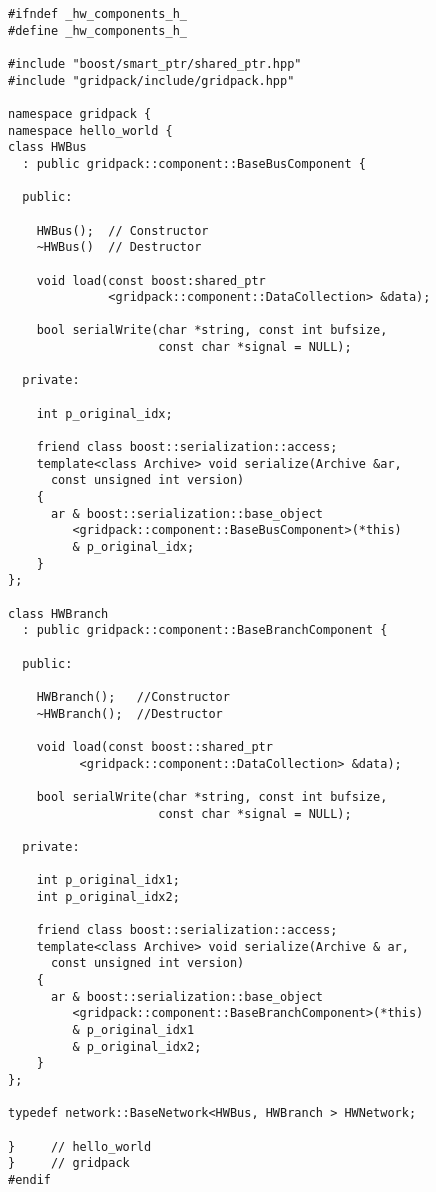 {
\color{red}
\begin{Verbatim}[fontseries=b]
#ifndef _hw_components_h_
#define _hw_components_h_

#include "boost/smart_ptr/shared_ptr.hpp"
#include "gridpack/include/gridpack.hpp"

namespace gridpack {
namespace hello_world {
class HWBus
  : public gridpack::component::BaseBusComponent {

  public:

    HWBus();  // Constructor
    ~HWBus()  // Destructor

    void load(const boost:shared_ptr
              <gridpack::component::DataCollection> &data);

    bool serialWrite(char *string, const int bufsize,
                     const char *signal = NULL);

  private:

    int p_original_idx;

    friend class boost::serialization::access;
    template<class Archive> void serialize(Archive &ar,
      const unsigned int version)
    {
      ar & boost::serialization::base_object
         <gridpack::component::BaseBusComponent>(*this)
         & p_original_idx;
    }
};

class HWBranch
  : public gridpack::component::BaseBranchComponent {

  public:

    HWBranch();   //Constructor
    ~HWBranch();  //Destructor

    void load(const boost::shared_ptr
          <gridpack::component::DataCollection> &data);

    bool serialWrite(char *string, const int bufsize,
                     const char *signal = NULL);

  private:

    int p_original_idx1;
    int p_original_idx2;

    friend class boost::serialization::access;
    template<class Archive> void serialize(Archive & ar,
      const unsigned int version)
    {
      ar & boost::serialization::base_object
         <gridpack::component::BaseBranchComponent>(*this)
         & p_original_idx1
         & p_original_idx2;
    }
};

typedef network::BaseNetwork<HWBus, HWBranch > HWNetwork;

}     // hello_world
}     // gridpack
#endif
\end{Verbatim}
}

